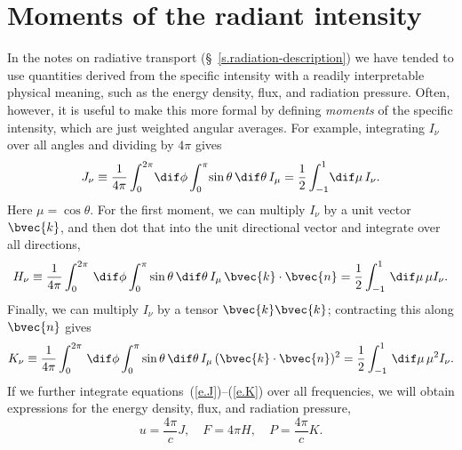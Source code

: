 \section[Radiant intensity]{Moments of the radiant intensity}

In the notes on radiative transport (\S~\ref{s.radiation-description}) we have tended to use quantities derived from the specific intensity with a readily interpretable physical meaning, such as the energy density, flux, and radiation pressure. Often, however, it is useful to make this more formal by defining \emph{moments} of the specific intensity, which are just weighted angular averages.  For example, integrating $I_{\nu}$ over all angles and dividing by $4\pi$ gives
\begin{equation}\label{e.J}
J_{\nu} \equiv \frac{1}{4\pi}\int_{0}^{2\pi}\!\dif\phi\int_{0}^{\pi}\!\sin\theta\,\dif\theta\, I_{\mu} = \frac{1}{2}\int_{-1}^{1} \!\dif\mu \,I_{\nu}.
\end{equation}
Here $\mu = \cos\theta$. For the first moment, we can multiply $I_{\nu}$ by a unit vector $\bvec{k}$, and then dot that into the unit directional vector and integrate over all directions,
\begin{equation}\label{e.H}
H_{\nu} \equiv \frac{1}{4\pi}\int_{0}^{2\pi}\,\dif\phi\int_{0}^{\pi}\sin\theta\,\dif\theta\, I_{\mu}\,\bvec{k}\cdot\bvec{n} = \frac{1}{2}\int_{-1}^{1} \,\dif\mu \,\mu I_{\nu}.
\end{equation}
Finally, we can multiply $I_{\nu}$ by a tensor $\bvec{k}\bvec{k}$; contracting this along $\bvec{n}$ gives
\begin{equation}\label{e.K}
K_{\nu} \equiv \frac{1}{4\pi}\int_{0}^{2\pi}\,\dif\phi\int_{0}^{\pi}\sin\theta\,\dif\theta\, I_{\mu}\,(\bvec{k}\cdot\bvec{n})^{2} = \frac{1}{2}\int_{-1}^{1} \,\dif\mu \,\mu^{2} I_{\nu}.
\end{equation}
If we further integrate equations~(\ref{e.J})--(\ref{e.K}) over all frequencies, we will obtain expressions for the energy density, flux, and radiation pressure,
\begin{equation}\label{e.thermal}
u = \frac{4\pi}{c}J,\quad F = 4\pi H,\quad P = \frac{4\pi}{c}K.
\end{equation}
